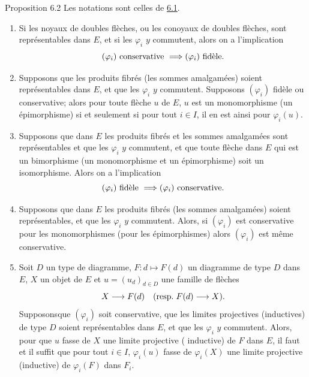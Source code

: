 \documentclass[10pt]{../fichiers-configuration-latex/smfart}
\def\labelenumi{(\theenumi)}
\begin{document}
\begin{enonce*}{Proposition 6.2}
Les notations sont celles de \hyperref[I.def6.1]{6.1}.
\begin{enumerate}
\renewcommand{\theenumi}{\roman{enumi}}
\renewcommand{\labelenumi}{(\theenumi)}
\item Si les noyaux de doubles flèches, ou les conoyaux de doubles
  flèches, sont représentables dans $E$, et si les $\varphi_i$ $y$
  commutent, alors on a l'implication
$$
(\varphi_i)\mbox{ conservative } \Longrightarrow (\varphi_i)\mbox{
    fidèle}{}.
$$

\item Supposons que les produits fibrés (\resp  les sommes
  amalgamées) soient représentables dans $E$, et que les
  $\varphi_i$ $y$ commutent. Supposons $(\varphi_i)$ fidèle ou
  conservative; alors pour toute flèche $u$ de $E$, $u$ est un
  monomorphisme (\resp  un épimorphisme) si et seulement si pour tout
  $i\in I$, il en est ainsi pour $\varphi_i(u)$.

\item Supposons que dans $E$ les produits fibrés et les sommes
  amalgamées sont représentables et que les $\varphi_i$ $y$
  commutent, et que toute flèche dans $E$ qui est un bimorphisme
  (\ie un monomorphisme et un épimorphisme) soit un
  isomorphisme. Alors on a l'implication
$$
(\varphi_i)\mbox{ fidèle } \Longrightarrow (\varphi_i)\mbox{
    conservative}{}.
$$

\item Supposons que dans $E$ les produits fibrés (\resp  les sommes
  amalgamées) soient représentables, et que les $\varphi_i$ $y$
  commutent. Alors, si $(\varphi_i)$ est conservative pour les
  monomorphismes (\resp  pour les épimorphismes) alors $(\varphi_i)$
  est même conservative.

\item Soit $D$ un type de diagramme, $F:d\mapsto F(d)$ un diagramme de
  type $D$ dans $E$, $X$ un objet de $E$ et $u=(u_d)_{d\in D}$ une
  famille de flèches
$$
X\longrightarrow F(d)\quad (\mbox{resp.\kern.3em} F(d)\longrightarrow
X){}.
$$
Supposons\pageoriginale que $(\varphi_i)$ soit conservative, que les
limites projectives (\resp  inductives) de type $D$ soient
représentables dans $E$, et que les $\varphi_i$ $y$ commutent.
Alors, pour que $u$ fasse de $X$ une limite projective (\resp
inductive) de $F$ dans $E$, il faut et il suffit que pour tout $i\in
I$, $\varphi_i(u)$ fasse de $\varphi_i(X)$ une limite projective
(\resp  inductive) de $\varphi_i(F)$ dans $F_i$.
\end{enumerate}
\end{enonce*}
\end{document}
